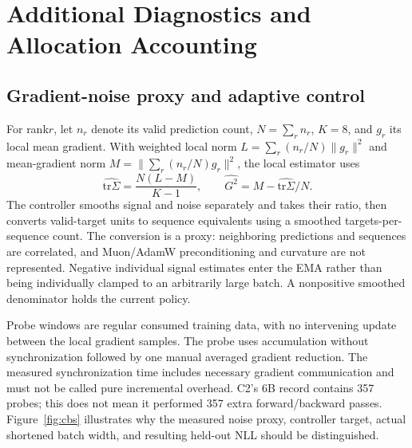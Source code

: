 \section{Additional Diagnostics and Allocation Accounting}
\label{app:additional}

\subsection{Gradient-noise proxy and adaptive control}

For rank$r$, let $n_r$ denote its valid prediction count, $N=\sum_r n_r$, $K=8$, and $g_r$ its local mean gradient. With weighted local norm $L=\sum_r(n_r/N)\lVert g_r\rVert^2$ and mean-gradient norm $M=\lVert\sum_r(n_r/N)g_r\rVert^2$, the local estimator uses
\begin{equation}
  \widehat{\mathrm{tr}\Sigma}=\frac{N(L-M)}{K-1},\qquad
  \widehat{G^2}=M-\widehat{\mathrm{tr}\Sigma}/N.
\end{equation}
The controller smooths signal and noise separately and takes their ratio, then converts valid-target units to sequence equivalents using a smoothed targets-per-sequence count. The conversion is a proxy: neighboring predictions and sequences are correlated, and Muon/AdamW preconditioning and curvature are not represented. Negative individual signal estimates enter the EMA rather than being individually clamped to an arbitrarily large batch. A nonpositive smoothed denominator holds the current policy.

Probe windows are regular consumed training data, with no intervening update between the local gradient samples. The probe uses accumulation without synchronization followed by one manual averaged gradient reduction. The measured synchronization time includes necessary gradient communication and must not be called pure incremental overhead. C2's 6B record contains 357 probes; this does not mean it performed 357 extra forward/backward passes. Figure~\ref{fig:cbs} illustrates why the measured noise proxy, controller target, actual shortened batch width, and resulting held-out NLL should be distinguished.


